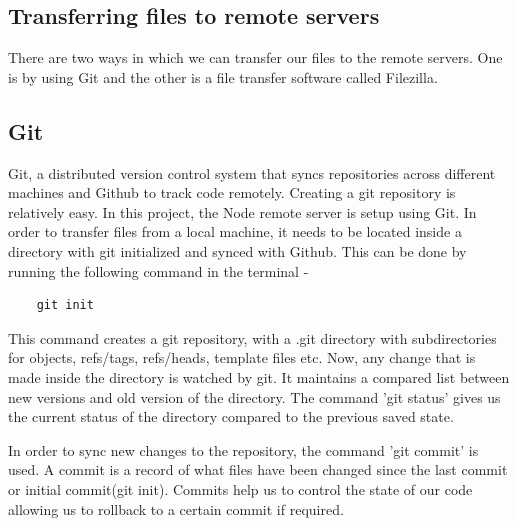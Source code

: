 \documentclass[../thesis.tex]{subfiles}
\begin{document}
	\subsection*{Transferring files to remote servers}
	There are two ways in which we can transfer our files to the remote servers. One is by using Git and the other is a file transfer software called Filezilla.
	
	\subsection*{Git}
	Git, a distributed version control system that syncs repositories across different machines and Github to track code remotely. Creating a git repository is relatively easy. In this project, the Node remote server is setup using Git. In order to transfer files from a local machine, it needs to be located inside a directory with git initialized and synced with Github. This can be done by running the following command in the terminal -
	\begin{verbatim}
	git init
	\end{verbatim}
	
	This command creates a git repository, with a .git directory with subdirectories for objects, refs/tags, refs/heads, template files etc. Now, any change that is made inside the directory is watched by git. It maintains a compared list between new versions and old version of the directory. The command 'git status' gives us the current status of the directory compared to the previous saved state.
	\newline
	
	In order to sync new changes to the repository, the command 'git commit' is used. A commit is a record of what files have been changed since the last commit or initial commit(git init). Commits help us to control the state of our code allowing us to rollback to a certain commit if required.
	\newline
	
\end{document}
